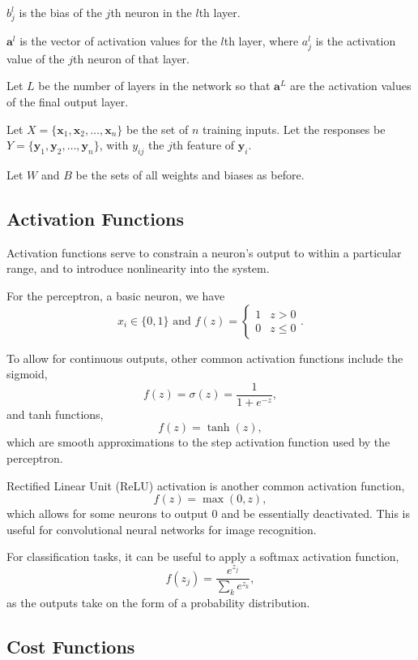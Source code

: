 \documentclass[honours,12pt]{unswthesis}
\numberwithin{equation}{section}
\begin{document}
$b_j^l$ is the bias of the $j$th neuron in the $l$th layer.

$\mathbf{a}^l$ is the vector of activation values for the $l$th layer, where $a_j^l$ is the activation value of the $j$th neuron of that layer.

Let $L$ be the number of layers in the network so that $\mathbf{a}^L$ are the activation values of the final output layer.

Let $X = \{\mathbf{x}_1, \mathbf{x}_2, \ldots, \mathbf{x}_n\}$ be the set of $n$ training inputs. Let the responses be $Y = \{\mathbf{y}_1, \mathbf{y}_2, \ldots, \mathbf{y}_n\}$, with $y_{ij}$ the $j$th feature of $\mathbf{y}_i$.

Let $W$ and $B$ be the sets of all weights and biases as before.

\subsection{Activation Functions}\label{nnets-act}

Activation functions serve to constrain a neuron's output to within a particular range, and to introduce nonlinearity into the system. 

For the perceptron, a basic neuron, we have
\[
	x_i \in \{0,1\} \text{ and } f(z) = \begin{cases}
		1 & z > 0 \\
		0 & z \le 0
	\end{cases}.
\]

To allow for continuous outputs, other common activation functions include the sigmoid,
\[
	f(z) = \sigma(z) = \dfrac{1}{1+e^{-z}},
\]
and tanh functions,
\[
	f(z) = \tanh(z),
\]
which are smooth approximations to the step activation function used by the perceptron.

Rectified Linear Unit (ReLU) activation is another common activation function,
\[
	f(z) = \max(0, z),
\]
which allows for some neurons to output 0 and be essentially deactivated. This is useful for convolutional neural networks for image recognition.

For classification tasks, it can be useful to apply a softmax activation function,
\[
	f(z_j) = \dfrac{e^{z_j}}{\sum_ke^{z_k}},
\]
as the outputs take on the form of a probability distribution.

\subsection{Cost Functions}\label{nnets-cost}
\end{document}
